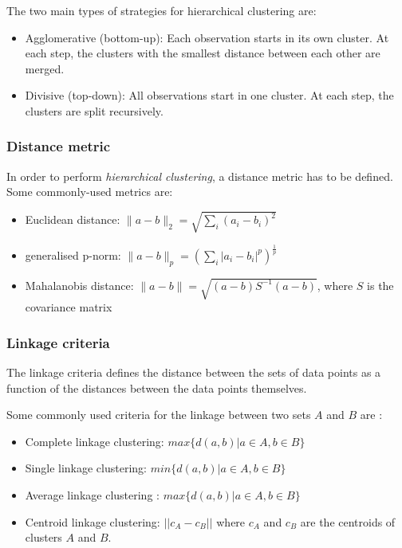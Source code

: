 The two main types of strategies for hierarchical clustering are:
\begin{itemize}
 \item Agglomerative (bottom-up): Each observation starts in its own cluster. At each step, the clusters with the smallest distance between each other are merged.  
 \item Divisive (top-down): All observations start in one cluster. At each step, the clusters are split recursively.
\end{itemize}

\subsubsection{Distance metric}
In order to perform \emph{hierarchical clustering}, a distance metric has to be defined. Some commonly-used metrics are:
\begin{itemize}
 \item Euclidean distance: $ \|a - b\|_2 = \sqrt{\sum_{i}(a_i - b_i)^2}$
 \item generalised p-norm: $ \|a - b\|_p = \left(\sum_{i}|a_i - b_i|^p\right)^\frac{1}{p}$
 \item Mahalanobis distance: $ \|a - b\| = \sqrt{(a - b)S^{-1}(a-b)}$, where $S$ is the covariance matrix
\end{itemize}


\subsubsection{Linkage criteria}

The linkage criteria defines the distance between the sets of data points as a function of the distances between the data points themselves. 

Some commonly used criteria for the linkage between two sets $A$ and $B$ are \cite{szekely2005hierarchical}:
\begin{itemize}
 \item Complete linkage clustering: $max \{d(a,b) | a \in A, b \in B\}$
 \item Single linkage clustering: $min \{d(a,b) | a \in A, b \in B\}$
 \item Average linkage clustering \cite{sokal1958statistical}: $max \{d(a,b) | a \in A, b \in B\}$
 \item Centroid linkage clustering: $ ||c_A - c_B|| $ where $c_A$ and $c_B$ are the centroids of clusters $A$ and $B$.
\end{itemize}


